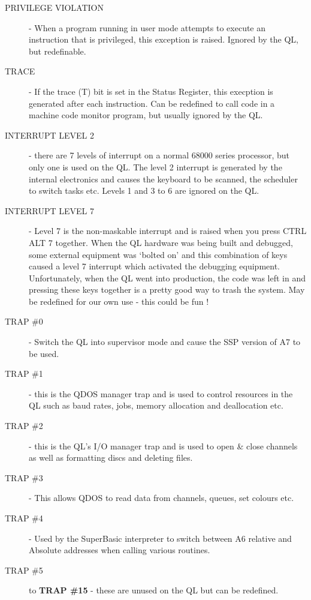 \begin{description}
\item[PRIVILEGE VIOLATION] -{} When a program running in user mode attempts
    to execute an instruction that is privileged, this exception is raised.
    Ignored by the QL, but redefinable.

\item[TRACE] -{} If the trace (T) bit is set in the Status Register, this
    execption is generated after each instruction. Can be redefined to call
    code in a machine code monitor program, but usually ignored by the
    QL.

\item[INTERRUPT LEVEL 2] -{} there are 7 levels of interrupt on a normal
    68000 series processor, but only one is used on the QL. The level 2
    interrupt is generated by the internal electronics and causes the keyboard
    to be scanned, the scheduler to switch tasks etc. Levels 1 and 3 to 6 are
    ignored on the QL.

\item[INTERRUPT LEVEL 7] -{} Level 7 is the non-{}maskable interrupt and is
    raised when you press CTRL ALT 7 together. When the QL hardware was being
    built and debugged, some external equipment was `bolted on' and this
    combination of keys caused a level 7 interrupt which activated the
    debugging equipment. Unfortunately, when the QL went into production, the
    code was left in and pressing these keys together is a pretty good way to
    trash the system. May be redefined for our own use -{} this could be fun
   !

\item[TRAP \#0] -{} Switch the QL into supervisor mode and cause the SSP
    version of A7 to be used.

\item[TRAP \#1] -{} this is the QDOS manager trap and is used to control
    resources in the QL such as baud rates, jobs, memory allocation and
    deallocation etc.

\item[TRAP \#2] -{} this is the QL's I/O manager trap and is used to open
    \& close channels as well as formatting discs and deleting
    files.

\item[TRAP \#3] -{} This allows QDOS to read data from channels, queues, set
    colours etc.

\item[TRAP \#4] -{} Used by the SuperBasic interpreter to switch between A6
    relative and Absolute addresses when calling various routines.

\item[TRAP \#5] to \textbf{TRAP \#15} -{} these are unused on the QL but can be
    redefined.

\end{description}

